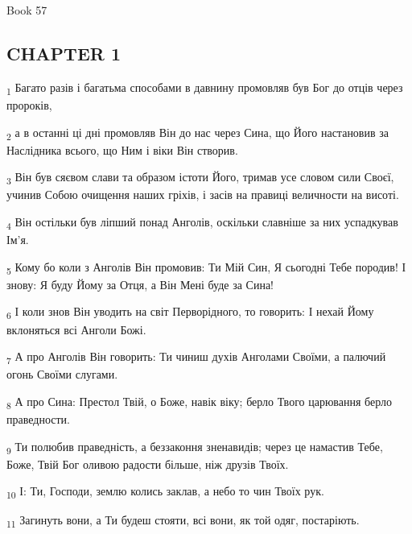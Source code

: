 Book 57
\subsection{CHAPTER 1}
\begin{tcolorbox}
\textsubscript{1} Багато разів і багатьма способами в давнину промовляв був Бог до отців через пророків,
\end{tcolorbox}
\begin{tcolorbox}
\textsubscript{2} а в останні ці дні промовляв Він до нас через Сина, що Його настановив за Наслідника всього, що Ним і віки Він створив.
\end{tcolorbox}
\begin{tcolorbox}
\textsubscript{3} Він був сяєвом слави та образом істоти Його, тримав усе словом сили Своєї, учинив Собою очищення наших гріхів, і засів на правиці величности на висоті.
\end{tcolorbox}
\begin{tcolorbox}
\textsubscript{4} Він остільки був ліпший понад Анголів, оскільки славніше за них успадкував Ім'я.
\end{tcolorbox}
\begin{tcolorbox}
\textsubscript{5} Кому бо коли з Анголів Він промовив: Ти Мій Син, Я сьогодні Тебе породив! І знову: Я буду Йому за Отця, а Він Мені буде за Сина!
\end{tcolorbox}
\begin{tcolorbox}
\textsubscript{6} І коли знов Він уводить на світ Перворідного, то говорить: І нехай Йому вклоняться всі Анголи Божі.
\end{tcolorbox}
\begin{tcolorbox}
\textsubscript{7} А про Анголів Він говорить: Ти чиниш духів Анголами Своїми, а палючий огонь Своїми слугами.
\end{tcolorbox}
\begin{tcolorbox}
\textsubscript{8} А про Сина: Престол Твій, о Боже, навік віку; берло Твого царювання берло праведности.
\end{tcolorbox}
\begin{tcolorbox}
\textsubscript{9} Ти полюбив праведність, а беззаконня зненавидів; через це намастив Тебе, Боже, Твій Бог оливою радости більше, ніж друзів Твоїх.
\end{tcolorbox}
\begin{tcolorbox}
\textsubscript{10} І: Ти, Господи, землю колись заклав, а небо то чин Твоїх рук.
\end{tcolorbox}
\begin{tcolorbox}
\textsubscript{11} Загинуть вони, а Ти будеш стояти, всі вони, як той одяг, постаріють.
\end{tcolorbox}
